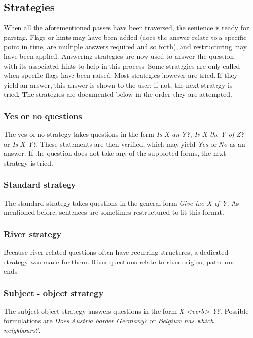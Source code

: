 \documentclass{article}
\begin{document}
\subsection{Strategies}
When all the aforementioned passes have been traversed, the sentence is ready for parsing. Flags or hints may have been added (does the answer relate to a specific point in time, are multiple answers required and so forth), and restructuring may have been applied. Answering strategies are now used to answer the question with its associated hints to help in this process. Some strategies are only called when specific flags have been raised. Most strategies however are tried. If they yield an answer, this answer is shown to the user; if not, the next strategy is tried. The strategies are documented below in the order they are attempted.

\subsubsection{Yes or no questions}
The yes or no strategy takes questions in the form \emph{Is X an Y?}, \emph{Is X the Y of Z?} or \emph{Is X Y?}. These statements are then verified, which may yield \emph{Yes} or \emph{No} as an answer. If the question does not take any of the supported forms, the next strategy is tried.

\subsubsection{Standard strategy}
The standard strategy takes questions in the general form \emph{Give the X of Y}. As mentioned before, sentences are sometimes restructured to fit this format.

\subsubsection{River strategy}
Because river related questions often have recurring structures, a dedicated strategy was made for them. River questions relate to river origins, paths and ends.

\subsubsection{Subject - object strategy}
The subject object strategy answers questions in the form \emph{X <verb> Y?}. Possible formulations are \emph{Does Austria border Germany?} or \emph{Belgium has which neighbours?}.
\end{document}

